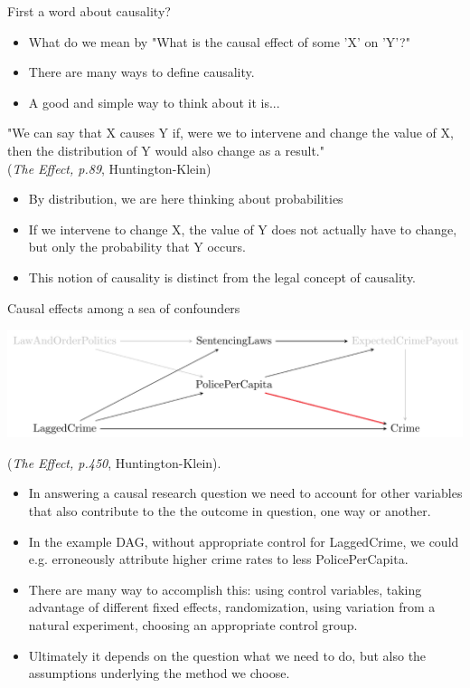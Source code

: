 \documentclass[notes,11pt, aspectratio=169]{beamer}
\begin{document}
\begin{frame}{First a word about causality?}
    \begin{itemize}
        \item What do we mean by "What is the causal effect of some 'X' on 'Y'?"
        \item There are many ways to define causality.
        \item A good and simple way to think about it is...
    \end{itemize}

    \begin{displayquote}
"We can say that X causes Y if, were we to intervene and change the value of X, then the distribution of Y would also change as a result."
\\
\flushright\tiny (\emph{The Effect, p.89}, Huntington-Klein)
\end{displayquote}
\normalsize
\begin{itemize}
        \item By distribution, we are here thinking about probabilities
        \item If we intervene to change X, the value of Y does not actually have to change, but only the probability that Y occurs. 
        \item This notion of causality is distinct from the legal concept of causality. 
    \end{itemize}
\end{frame}



\begin{frame}{Causal effects among a sea of confounders}
    \begin{center}
        \includegraphics[width=0.8\linewidth]{24_DiDLecture/24_DiDLecture_DAG.png}
    \end{center}
    \flushright
    \tiny{ (\emph{The Effect, p.450}, Huntington-Klein)}.
\normalsize
\flushleft
    \vspace{0.1cm}
    \begin{itemize}
    \item In answering a causal research question we need to account for other variables that also contribute to the the outcome in question, one way or another. 
    \item In the example DAG, without appropriate control for LaggedCrime, we could e.g. erroneously attribute higher crime rates to less PolicePerCapita.    
    \item There are many way to accomplish this: using control variables, taking advantage of different fixed effects, randomization, using variation from a natural experiment, choosing an appropriate control group.
    \item Ultimately it depends on the question what we need to do, but also the assumptions underlying the method we choose.
    \end{itemize}
\end{frame}
\end{document}
